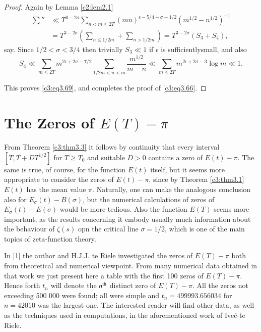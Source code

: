 \begin{proof}
Again by Lemma \ref{c2:lem2.1}
\begin{align*}
  {\sum}'' & \ll T^{3-2\sigma} \sum_{n < m \leq 2T}
  (mn)^{\epsilon - 5/4+ \sigma-1/2}(m^{1/2} - n^{1/2})^{-1}\\
  & = T^{3-2\sigma} \left(\sum_{n \leq 1/2 m} + \sum_{n > 1/2 m}
  \right) = T^{3-2\sigma}(S_3 + S_4),
\end{align*}
say. Since $1/2 < \sigma < 3/4$ then trivially $S_3 \ll 1$ if
$\epsilon$ is sufficiently\pageoriginale small, and also 
$$
S_4 \ll \sum_{m \leq 2T} m^{2 \epsilon + 2 \sigma - 7/2} \sum_{1/2 m
  <n < m} \frac{m^{1/2}}{m-n} \ll \sum_{m \leq 2T} m^{2 \epsilon + 2
  \sigma -3} \log m \ll 1.
$$

This proves \eqref{c3:eq3.69}, and completes the proof of \eqref{c3:eq3.66}. 
\end{proof}

\section{The Zeros of $E(T)- \pi$}\label{c3:sec3.4}

From Theorem \ref{c3:thm3.3} it follows by continuity that every
interval $[T, T+ D T^{1/2}]$ for $T \geq T_0$ and suitable $D> 0$
contains a zero of $E(t)- \pi$. The same is true, of course, for the
function $E(t)$ itself, but it seems more appropriate to consider the
zeros of $E(t)- \pi$, since by Theorem \ref{c3:thm3.1} $E(t)$ has the
mean value $\pi$. Naturally, one can make the analogous conclusion
also for $E_\sigma(t)- B(\sigma)$, but the numerical calculations of
zeros of $E_\sigma(t)- E(\sigma)$ would be more tedious. Also the
function $E(T)$ seems more important, as the results concerning it
embody usually much information about the behaviour of $\zeta(s)$ opn
the critical line $\sigma = 1/2$, which is one of the main topics of
zeta-function theory.

In [1] the author and H.J.J. te Riele investigated the zeros of
$E(T)- \pi$ both from theoretical and numerical viewpoint. From many
numerical data obtained in that work we just present here a table with
the first 100 zeros of $E(T)-\pi$. Hence forth $t_n$ will denote the
$n^{\rm th}$ distinct zero of $E(T)-\pi$. All the zeros not exceeding 500
000 were found; all were simple and $t_n =499993.656034$ for $n=
42010$ was the largest one. The interested reader will find other
data, as well as the techniques used in computations, in the
aforementioned work of Ive\'c-te Riele.\pageoriginale

